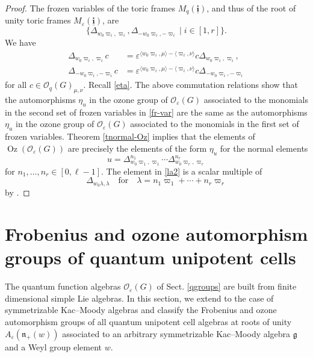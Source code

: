\documentclass[11pt]{amsart}
\theoremstyle{plain}
\newcommand{\cleqn}{\setcounter{equation}{0}}
\newcommand{\clth}{\setcounter{theorem}{0}}
\newcommand {\sectionnew}[1]{\section{#1}\cleqn\clth}
\newcommand \thref[1]{Theorem \ref{t#1}}
\newcommand \lb[1]{\label{#1}}
\def \OO {{\mathcal{O}}}
\def \la {\lambda}
\def \ep {\varepsilon}
\newcommand{\ubi}{\underline{\mathbf{i}}}
\def \g  {\mathfrak{g}}   %
\def \n  {\mathfrak{n}}
\DeclareMathOperator \Oz { {\mathrm{Oz}}}
\begin{document}
\begin{proof}
The frozen variables of the toric frames $M_q(\ubi)$, and thus of the root of unity toric frames $M_\ep(\ubi)$, are
\begin{equation}
\label{fr-var}
\{ \Delta_{w_0\varpi_i,\varpi_i}, \Delta_{-w_0\varpi_i,-\varpi_i}
\mid i \in [1,r] \}. 
\end{equation}
We have \cite[Eqs. (2.22)--(2.23)]{Y-spec}
\begin{align*}
\Delta_{w_0\varpi_i,\varpi_i} c &= 
\ep^{\langle w_0 \varpi_i, \mu \rangle - 
\langle \varpi_i, \nu \rangle} 
c \Delta_{w_0\varpi_i,\varpi_i},
\\
\Delta_{-w_0\varpi_i,-\varpi_i} c & = 
\ep^{\langle w_0 \varpi_i, \mu \rangle -
\langle \varpi_i, \nu \rangle} 
c\Delta_{-w_0\varpi_i,-\varpi_i} 
\end{align*}
for all $c \in \OO_q(G)_{\mu, \nu}$. Recall \eqref{eta}. The above commutation relations show that the automorphisms $\eta_u$ in the ozone group of $\OO_\ep(G)$ associated to the monomials in the second set of frozen variables in \eqref{fr-var} are the same as the automorphisms $\eta_u$ in the ozone group of $\OO_\ep(G)$ associated to the monomials in the first set of frozen variables. \thref{normal-Oz} implies that the elements of $\Oz(\OO_\ep(G))$ are precisely the elements of the form $\eta_u$ for the normal elements 
\begin{equation}
\label{la2}
u = \Delta_{w_0 \varpi_1, \varpi_1}^{n_1} \cdots 
\Delta_{w_0 \varpi_r, \varpi_r}^{n_r}
\end{equation}
for $n_1, \ldots, n_r \in [0, \ell -1]$. The element in \eqref{la2} is a scalar multiple of 
\[
\Delta_{w_0 \la, \la} \quad \mbox{for} \quad\la = n_1 \varpi_1 + \cdots + n_r \varpi_r
\]
by \cite[Eq. (2.18)]{Y-spec}.
\end{proof} 
\sectionnew{Frobenius and ozone automorphism groups of quantum unipotent cells}
\lb{unipotent}
The quantum function algebras $\OO_\ep(G)$ of Sect. \ref{qgroups} are built from finite dimensional simple Lie algebras. In this section, we extend to the case of symmetrizable Kac--Moody algebras and classify the Frobenius and ozone automorphism groups of all quantum unipotent cell algebras at roots of unity $A_\ep(\n_+(w))$ associated to an arbitrary symmetrizable Kac--Moody algebra $\g$ and a Weyl group element $w$. 
\end{document}
